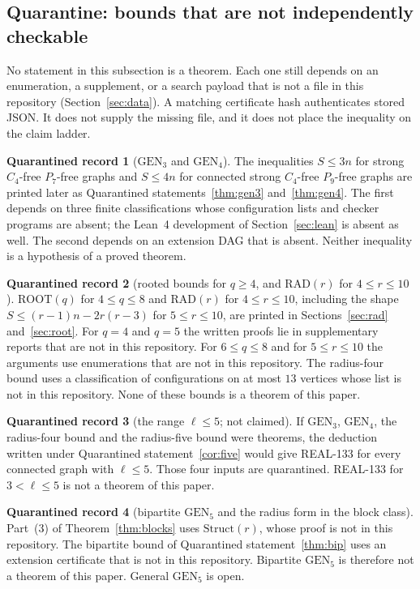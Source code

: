 \documentclass[11pt]{amsart}
\theoremstyle{definition}
\newtheorem*{qbox}{Quarantined record}
\theoremstyle{remark}
\newcommand{\lr}{\ell}
\newcommand{\GEN}{\mathrm{GEN}}
\newcommand{\RAD}{\mathrm{RAD}}
\newcommand{\ROOT}{\mathrm{ROOT}}
\begin{document}
\subsection*{Quarantine: bounds that are not independently checkable}
No statement in this subsection is a theorem. Each one still depends on an enumeration, a supplement, or a search payload that is not a file in this repository (Section~\ref{sec:data}). A matching certificate hash authenticates stored JSON. It does not supply the missing file, and it does not place the inequality on the claim ladder.

\begin{qbox}[$\GEN_3$ and $\GEN_4$]
The inequalities $S\le 3n$ for strong $C_4$-free $P_7$-free graphs and $S\le 4n$ for connected strong $C_4$-free $P_9$-free graphs are printed later as Quarantined statements~\ref{thm:gen3} and~\ref{thm:gen4}. The first depends on three finite classifications whose configuration lists and checker programs are absent; the Lean~4 development of Section~\ref{sec:lean} is absent as well. The second depends on an extension DAG that is absent. Neither inequality is a hypothesis of a proved theorem.
\end{qbox}

\begin{qbox}[rooted bounds for $q\ge 4$, and $\RAD(r)$ for $4\le r\le 10$]
$\ROOT(q)$ for $4\le q\le 8$ and $\RAD(r)$ for $4\le r\le 10$, including the shape $S\le(r-1)n-2r(r-3)$ for $5\le r\le 10$, are printed in Sections~\ref{sec:rad} and~\ref{sec:root}. For $q=4$ and $q=5$ the written proofs lie in supplementary reports that are not in this repository. For $6\le q\le 8$ and for $5\le r\le 10$ the arguments use enumerations that are not in this repository. The radius-four bound uses a classification of configurations on at most $13$ vertices whose list is not in this repository. None of these bounds is a theorem of this paper.
\end{qbox}

\begin{qbox}[the range $\lr\le 5$; not claimed]
If $\GEN_3$, $\GEN_4$, the radius-four bound and the radius-five bound were theorems, the deduction written under Quarantined statement~\ref{cor:five} would give REAL-133 for every connected graph with $\lr\le 5$. Those four inputs are quarantined. REAL-133 for $3<\lr\le 5$ is not a theorem of this paper.
\end{qbox}

\begin{qbox}[bipartite $\GEN_5$ and the radius form in the block class]
Part~(3) of Theorem~\ref{thm:blocks} uses $\mathrm{Struct}(r)$, whose proof is not in this repository. The bipartite bound of Quarantined statement~\ref{thm:bip} uses an extension certificate that is not in this repository. Bipartite $\GEN_5$ is therefore not a theorem of this paper. General $\GEN_5$ is open.
\end{qbox}
\end{document}
